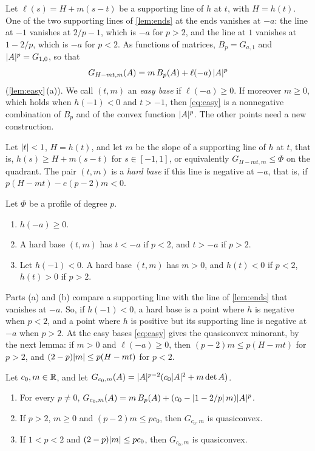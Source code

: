 Let $\ell(s)=H+m(s-t)$ be a supporting line of $h$ at $t$, with $H=h(t)$. One of the two
supporting lines of \cref{lem:ends} at the ends vanishes at $-a$: the line at $-1$ vanishes at
$2/p-1$, which is $-a$ for $p>2$, and the line at $1$ vanishes at $1-2/p$, which is $-a$ for
$p<2$. As functions of matrices, $B_p=G_{a,1}$ and $\lvert A\rvert^p=G_{1,0}$, so that
\begin{equation}\label{eq:easy}
  G_{H-mt,m}(A)=m\,B_p(A)+\ell(-a)\,\lvert A\rvert^p
\end{equation}
(\cref{lem:easy}\,(a)).
We call $(t,m)$ an \emph{easy base} if $\ell(-a)\ge0$. If moreover $m\ge0$, which holds when
$h(-1)<0$ and $t>-1$, then \eqref{eq:easy} is a nonnegative combination of $B_p$ and of the
convex function $\lvert A\rvert^p$. The other points need a new construction.

\begin{definition}\label{def:hard}
Let $\lvert t\rvert<1$, $H=h(t)$, and let $m$ be the slope of a supporting line of $h$ at $t$, that is,
$h(s)\ge H+m(s-t)$ for $s\in[-1,1]$, or equivalently $G_{H-mt,m}\le\Phi$ on the quadrant. The
pair $(t,m)$ is a \emph{hard base} if this line is negative at $-a$, that is, if
$p(H-mt)-e(p-2)m<0$.
\end{definition}

\begin{lemma}\label{lem:hard}
Let $\Phi$ be a profile of degree $p$.
\begin{enumerate}[label=\textup{(\alph*)}]
\item $h(-a)\ge0$.
\item A hard base $(t,m)$ has $t<-a$ if $p<2$, and $t>-a$ if $p>2$.
\item Let $h(-1)<0$. A hard base $(t,m)$ has $m>0$, and $h(t)<0$ if $p<2$, $h(t)>0$ if $p>2$.
\end{enumerate}
\end{lemma}

Parts (a) and (b) compare a supporting line with the line of \cref{lem:ends} that vanishes at
$-a$. So, if $h(-1)<0$, a hard base is a point where $h$ is negative when $p<2$, and a point
where $h$ is positive but its supporting line is negative at $-a$ when $p>2$. At the easy bases
\eqref{eq:easy} gives the quasiconvex minorant, by the next lemma: if $m>0$ and $\ell(-a)\ge0$,
then $(p-2)m\le p(H-mt)$ for $p>2$, and $(2-p)\lvert m\rvert\le p(H-mt)$ for $p<2$.

\begin{lemma}\label{lem:easy}
Let $c_0,m\in\mathbb{R}$, and let $G_{c_0,m}(A)=\lvert A\rvert^{p-2}(c_0\lvert A\rvert^2+m\det A)$.
\begin{enumerate}[label=\textup{(\alph*)}]
\item For every $p\ne0$, $G_{c_0,m}(A)=m\,B_p(A)+(c_0-\lvert 1-2/p\rvert\,m)\lvert A\rvert^p$.
\item If $p>2$, $m\ge0$ and $(p-2)m\le pc_0$, then $G_{c_0,m}$ is quasiconvex.
\item If $1<p<2$ and $(2-p)\lvert m\rvert\le pc_0$, then $G_{c_0,m}$ is quasiconvex.
\end{enumerate}
\end{lemma}

